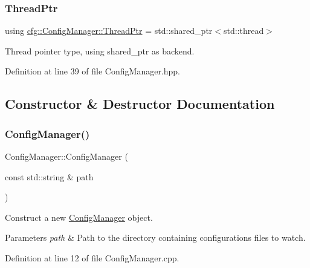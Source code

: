 \subsubsection{\texorpdfstring{Thread\+Ptr}{ThreadPtr}}
{\footnotesize\ttfamily using \hyperlink{classcfg_1_1_config_manager_abb7d9a63860843839fa4d8f339f0122b}{cfg\+::\+Config\+Manager\+::\+Thread\+Ptr} =  std\+::shared\+\_\+ptr$<$std\+::thread$>$}



Thread pointer type, using shared\+\_\+ptr as backend. 



Definition at line 39 of file Config\+Manager.\+hpp.



\subsection{Constructor \& Destructor Documentation}
\mbox{\label{classcfg_1_1_config_manager_a5434bffe1b9b3a20026e2526601911f2}} 
\subsubsection{\texorpdfstring{Config\+Manager()}{ConfigManager()}\hspace{0.1cm}{\footnotesize\ttfamily [1/2]}}
{\footnotesize\ttfamily Config\+Manager\+::\+Config\+Manager (\begin{DoxyParamCaption}\item[{const std\+::string \&}]{path }\end{DoxyParamCaption})}



Construct a new \hyperlink{classcfg_1_1_config_manager}{Config\+Manager} object. 


\begin{DoxyParams}{Parameters}
{\em path} & Path to the directory containing configurations files to watch. \\
\hline
\end{DoxyParams}


Definition at line 12 of file Config\+Manager.\+cpp.

\mbox{\label{classcfg_1_1_config_manager_a7d3d7c10423d969f7544509f6fcca32f}} 
